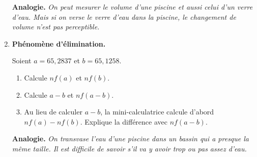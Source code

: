\documentclass[class=report,crop=false,12pt]{standalone}
\begin{document}
\begin{activite}
\begin{enumerate}
  
    \textbf{Analogie.} \emph{On peut mesurer le volume d'une piscine et aussi celui d'un verre d'eau. Mais si on verse le verre d'eau dans la piscine, le changement de volume n'est pas perceptible.} 
  
  \item \textbf{Phénomène d'élimination.}

    Soient $a = 65,2837$ et $b = 65,1258$.
  \begin{enumerate}
    \item Calcule $nf(a)$ et $nf(b)$.
    \item Calcule $a - b$ et $nf(a - b)$.
    \item Au lieu de calculer $a - b$, la mini-calculatrice calcule d'abord $nf(a) - nf(b)$. Explique la différence avec $nf(a - b)$.
  \end{enumerate}

    \textbf{Analogie.} \emph{On transvase l'eau d'une piscine dans un bassin qui a presque la même taille. Il est difficile de savoir s'il va y avoir trop ou pas assez d'eau.}
     
\end{enumerate}


\end{activite}
\end{document}
